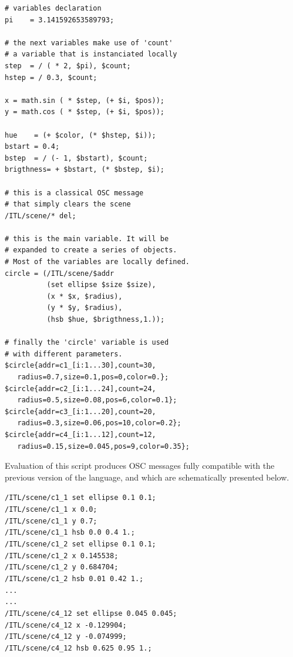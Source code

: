\documentclass{article}
\newcommand{\code}	[2][0.9]		{\vspace{0mm}\begin{center}\colorbox{mygrey}{
							\begin{minipage}[t]{#1\columnwidth} 
							{\small \texttt{#2}}
							\end{minipage}}\end{center}}
\begin{document}

\begin{lstlisting}[language=inscore, extendedchars=true, basicstyle=\small\ttfamily]
# variables declaration 
pi    = 3.141592653589793;

# the next variables make use of 'count'
# a variable that is instanciated locally
step  = / ( * 2, $pi), $count;
hstep = / 0.3, $count;

x = math.sin ( * $step, (+ $i, $pos));
y = math.cos ( * $step, (+ $i, $pos));

hue    = (+ $color, (* $hstep, $i));
bstart = 0.4;
bstep  = / (- 1, $bstart), $count;
brigthness= + $bstart, (* $bstep, $i);

# this is a classical OSC message
# that simply clears the scene
/ITL/scene/* del;

# this is the main variable. It will be
# expanded to create a series of objects.
# Most of the variables are locally defined.  
circle = (/ITL/scene/$addr  
          (set ellipse $size $size),
          (x * $x, $radius),
          (y * $y, $radius),
          (hsb $hue, $brigthness,1.));

# finally the 'circle' variable is used
# with different parameters. 
$circle{addr=c1_[i:1...30],count=30, 
   radius=0.7,size=0.1,pos=0,color=0.};
$circle{addr=c2_[i:1...24],count=24,
   radius=0.5,size=0.08,pos=6,color=0.1};
$circle{addr=c3_[i:1...20],count=20,
   radius=0.3,size=0.06,pos=10,color=0.2};
$circle{addr=c4_[i:1...12],count=12,
   radius=0.15,size=0.045,pos=9,color=0.35};

\end{lstlisting}


Evaluation of this script produces OSC messages fully compatible with the previous version of the language, and which are schematically presented below. 
\code[1]{/ITL/scene/c1\_1 set ellipse 0.1 0.1;\\
/ITL/scene/c1\_1 x 0.0;\\
/ITL/scene/c1\_1 y 0.7;\\
/ITL/scene/c1\_1 hsb 0.0 0.4 1.;\\
/ITL/scene/c1\_2 set ellipse 0.1 0.1;\\
/ITL/scene/c1\_2 x 0.145538;\\
/ITL/scene/c1\_2 y 0.684704;\\
/ITL/scene/c1\_2 hsb 0.01 0.42 1.;\\
...\\
...\\
/ITL/scene/c4\_12 set ellipse 0.045 0.045;\\
/ITL/scene/c4\_12 x -0.129904;\\
/ITL/scene/c4\_12 y -0.074999;\\
/ITL/scene/c4\_12 hsb 0.625 0.95 1.;
}
\end{document}
